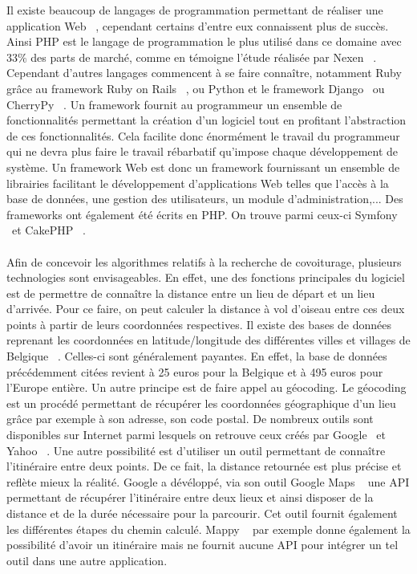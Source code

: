 \documentclass[12pt, a4paper, oneside]{article}
\begin{document}
    \indent Il existe beaucoup de langages de programmation permettant de réaliser une application Web ~\cite{web-development}, cependant certains d'entre eux connaissent plus de succès. Ainsi PHP est le langage de programmation le plus utilisé dans ce domaine avec 33$\%$ des parts de marché, comme en témoigne l'étude réalisée par Nexen ~\cite{stats-PHP}. Cependant d'autres langages commencent à se faire connaître, notamment Ruby grâce au framework Ruby on Rails ~\cite{ROR}, ou Python et le framework Django ~\cite{Django}ou CherryPy ~\cite{CherryPy}. Un framework fournit au programmeur un ensemble de fonctionnalités permettant la création d'un logiciel tout en profitant l'abstraction de ces fonctionnalités. Cela facilite donc énormément le travail du programmeur qui ne devra plus faire le travail rébarbatif qu'impose chaque développement de système. Un framework Web est donc un framework fournissant un ensemble de librairies facilitant le développement d'applications Web telles que l'accès à la base de données, une gestion des utilisateurs, un module d'administration,... Des frameworks ont également été écrits en PHP. On trouve parmi ceux-ci Symfony ~\cite{Symfony}et CakePHP ~\cite{CakePHP}.\\\\
    \indent Afin de concevoir les algorithmes relatifs à la recherche de covoiturage, plusieurs technologies sont envisageables. En effet, une des fonctions principales du logiciel est de permettre de connaître la distance entre un lieu de départ et un lieu d'arrivée. Pour ce faire, on peut calculer la distance à vol d'oiseau entre ces deux points à partir de leurs coordonnées respectives. Il existe des bases de données reprenant les coordonnées en latitude/longitude des différentes villes et villages de Belgique ~\cite{zip-code-DB}. Celles-ci sont généralement payantes. En effet, la base de données précédemment citées revient à 25 euros pour la Belgique et à 495 euros pour l'Europe entière. Un autre principe est de faire appel au géocoding. Le géocoding est un procédé permettant de récupérer les coordonnées géographique d'un lieu grâce par exemple à son adresse, son code postal. De nombreux outils sont disponibles sur Internet parmi lesquels on retrouve ceux créés par Google ~\cite{google-geoconding}et Yahoo ~\cite{yahoo-geocoding}. Une autre possibilité est d'utiliser un outil permettant de connaître l'itinéraire entre deux points. De ce fait, la distance retournée est plus précise et reflète mieux la réalité. Google a dévéloppé, via son outil Google Maps ~\cite{google-map} une API permettant de récupérer l'itinéraire entre deux lieux et ainsi disposer de la distance et de la durée nécessaire pour la parcourir. Cet outil fournit également les différentes étapes du chemin calculé. Mappy ~\cite{Mappy} par exemple donne également la possibilité d'avoir un itinéraire mais ne fournit aucune API pour intégrer un tel outil dans une autre application.
\end{document}
